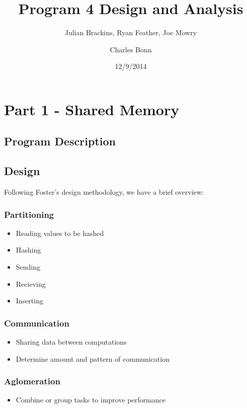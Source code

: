\documentclass{article}
\begin{document}
\title{Program 4 Design and Analysis}
\author{Julian Brackins, Ryan Feather, Joe Mowry \and Charles Bonn}
\date{12/9/2014}
\maketitle

\section{Part 1 - Shared Memory}

\subsection{Program Description}

\subsection{Design}
Following Foster's design methodology, we have a brief overview:

\subsubsection{Partitioning}
        \begin{itemize}
            \item Reading values to be hashed
            \item Hashing
            \item Sending
            \item Recieving
            \item Inserting
        \end{itemize}
\subsubsection{Communication}
        \begin{itemize}
            \item Sharing data between computations
            \item Determine amount and pattern of communication
        \end{itemize}
\subsubsection{Aglomeration}
        \begin{itemize}
            \item Combine or group tasks to improve performance
        \end{itemize}
\end{document}
